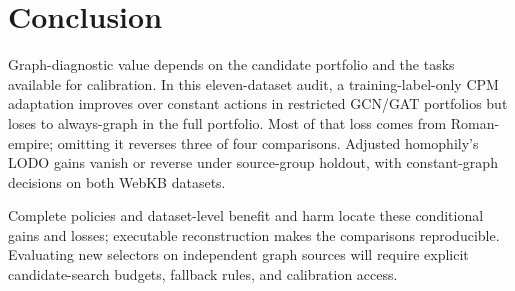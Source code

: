 \section{Conclusion}

Graph-diagnostic value depends on the candidate portfolio and the tasks available for calibration. In this eleven-dataset audit, a training-label-only CPM adaptation improves over constant actions in restricted GCN/GAT portfolios but loses to always-graph in the full portfolio. Most of that loss comes from Roman-empire; omitting it reverses three of four comparisons. Adjusted homophily's LODO gains vanish or reverse under source-group holdout, with constant-graph decisions on both WebKB datasets.

Complete policies and dataset-level benefit and harm locate these conditional gains and losses; executable reconstruction makes the comparisons reproducible. Evaluating new selectors on independent graph sources will require explicit candidate-search budgets, fallback rules, and calibration access.
